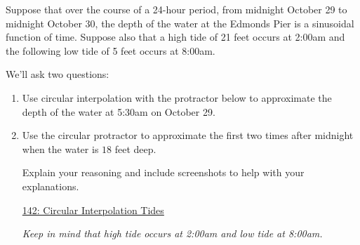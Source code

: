 \documentclass{ximera}
\begin{document}
\begin{example}  \label{E888b0bbdsdsf}
Suppose that over the course of a 24-hour period, from midnight October 29 to midnight October 30, the depth of the water at the Edmonds Pier is a sinusoidal function of time. Suppose also that a high tide of 21 feet occurs at 2:00am and the following low tide of 5 feet occurs at 8:00am. 

We'll ask two questions:

\begin{enumerate}
\item Use circular interpolation with the protractor below to approximate the depth of the water at 5:30am on October 29.

\item Use the circular protractor to approximate the first two times after midnight when the water is $18$ feet deep.

Explain your reasoning and include screenshots to help with your explanations.
\begin{freeResponse}
\end{freeResponse}

\begin{onlineOnly}
    \begin{center}
\end{center}
\end{onlineOnly}

\href{https://www.desmos.com/calculator/0wxwmkzvky}{142: Circular Interpolation Tides}

\emph{Keep in mind that high tide occurs at 2:00am and low tide at 8:00am.}

\end{enumerate}
\end{example}
\end{document}
